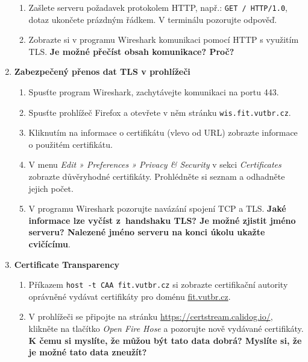 \documentclass[a4paper,11pt]{article}
\begin{document}
\begin{enumerate}
\begin{enumerate}
      \item Zašlete serveru požadavek protokolem HTTP, např.:
        \verb|GET / HTTP/1.0|, dotaz ukončete prázdným řádkem. V terminálu pozorujte
        odpověď.

      \item Zobrazte si v programu Wireshark komunikaci pomocí HTTP s využitím
        TLS. {\bf Je možné přečíst obsah komunikace? Proč?}

    \end{enumerate}

  \item {\bf Zabezpečený přenos dat TLS v prohlížeči}

    \begin{enumerate}

      \item Spusťte program Wireshark, zachytávejte komunikaci na portu 443.

      \item Spusťte prohlížeč Firefox a otevřete v něm stránku
        \verb|wis.fit.vutbr.cz|.

      \item Kliknutím na informace o certifikátu (vlevo od URL) zobrazte
        informace o použitém certifikátu.

      \item V menu \emph{Edit » Preferences » Privacy \& Security} v sekci
        \emph{Certificates} zobrazte důvěryhodné certifikáty. Prohlédněte si
        seznam a odhadněte jejich počet.

      \item V programu Wireshark pozorujte navázání spojení TCP a TLS. {\bf Jaké
        informace lze vyčíst z~handshaku TLS? Je možné zjistit jméno serveru?
        Nalezené jméno serveru na konci úkolu ukažte cvičícímu}.

    \end{enumerate}

  \item {\bf Certificate Transparency}

    \begin{enumerate}

      \item Příkazem \verb|host -t CAA fit.vutbr.cz| si zobrazte certifikační
        autority oprávněné vydávat certifikáty pro doménu \url{fit.vutbr.cz}.

      \item V prohlížeči se připojte na stránku
        \url{https://certstream.calidog.io/}, klikněte na tlačítko \emph{Open
        Fire Hose} a pozorujte nově vydávané certifikáty. {\bf K čemu si myslíte, že
        můžou být tato data dobrá? Myslíte si, že je možné tato data zneužít?}


\end{enumerate}
\end{enumerate}
\end{document}
